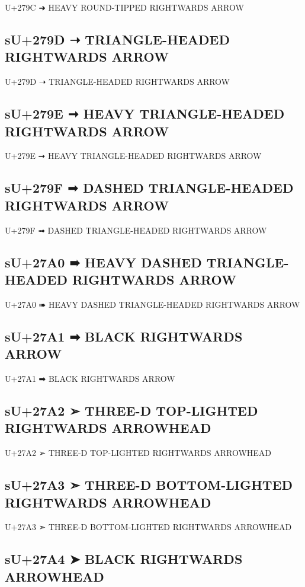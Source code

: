 U+279C ➜ HEAVY ROUND-TIPPED RIGHTWARDS ARROW

\subsection{sU+279D ➝ TRIANGLE-HEADED RIGHTWARDS ARROW}

U+279D ➝ TRIANGLE-HEADED RIGHTWARDS ARROW

\subsection{sU+279E ➞ HEAVY TRIANGLE-HEADED RIGHTWARDS ARROW}

U+279E ➞ HEAVY TRIANGLE-HEADED RIGHTWARDS ARROW

\subsection{sU+279F ➟ DASHED TRIANGLE-HEADED RIGHTWARDS ARROW}

U+279F ➟ DASHED TRIANGLE-HEADED RIGHTWARDS ARROW

\subsection{sU+27A0 ➠ HEAVY DASHED TRIANGLE-HEADED RIGHTWARDS ARROW}

U+27A0 ➠ HEAVY DASHED TRIANGLE-HEADED RIGHTWARDS ARROW

\subsection{sU+27A1 ➡ BLACK RIGHTWARDS ARROW}

U+27A1 ➡ BLACK RIGHTWARDS ARROW

\subsection{sU+27A2 ➢ THREE-D TOP-LIGHTED RIGHTWARDS ARROWHEAD}

U+27A2 ➢ THREE-D TOP-LIGHTED RIGHTWARDS ARROWHEAD

\subsection{sU+27A3 ➣ THREE-D BOTTOM-LIGHTED RIGHTWARDS ARROWHEAD}

U+27A3 ➣ THREE-D BOTTOM-LIGHTED RIGHTWARDS ARROWHEAD

\subsection{sU+27A4 ➤ BLACK RIGHTWARDS ARROWHEAD}

